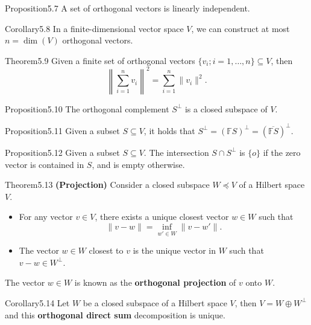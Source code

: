 \begin{res}{Proposition}{5.7}
A set of orthogonal vectors is linearly independent.
\end{res}

\begin{res}{Corollary}{5.8}
In a finite-dimensional vector space $V$, we can construct at most $n=\dim(V)$ orthogonal vectors.
\end{res}

\begin{res}[Pythagoras]{Theorem}{5.9}
Given a finite set of orthogonal vectors $\{v_i;i=1,\dots,n\}\subseteq V$, then
\begin{equation}\left\|\sum_{i=1}^nv_i\right\|^2=\sum_{i=1}^n\|v_i\|^2.\tag{5.21}\end{equation}
\end{res}

\begin{res}{Proposition}{5.10}
The orthogonal complement $S^\perp$ is a closed subspace of $V$.
\end{res}

\begin{res}{Proposition}{5.11}
Given a subset $S\subseteq V$, it holds that $S^\perp=(\mathbb FS)^\perp=(\overline{\mathbb FS})^\perp$.
\end{res}

\begin{res}{Proposition}{5.12}
Given a subset $S\subseteq V$. The intersection $S\cap S^\perp$ is $\{o\}$ if the zero vector is contained in $S$, and is empty otherwise.
\end{res}

\begin{res}{Theorem}{5.13} \textbf{(Projection)}
Consider a closed subspace $W\preccurlyeq V$ of a Hilbert space $V$.
\begin{itemize}
\item For any vector $v\in V$, there exists a unique closest vector $w\in W$ such that
\begin{equation}\|v-w\|=\inf_{w'\in W}\|v-w'\|.\tag{5.23}\end{equation}
\item The vector $w\in W$ closest to $v$ is the unique vector in $W$ such that $v-w\in W^\perp$.
\end{itemize}
The vector $w\in W$ is known as the \textbf{orthogonal projection} of $v$ onto $W$.
\end{res}

\begin{res}{Corollary}{5.14}
Let $W$ be a closed subspace of a Hilbert space $V$, then $V=W\oplus W^\perp$ and this \textbf{orthogonal direct sum} decomposition is unique.
\end{res}

